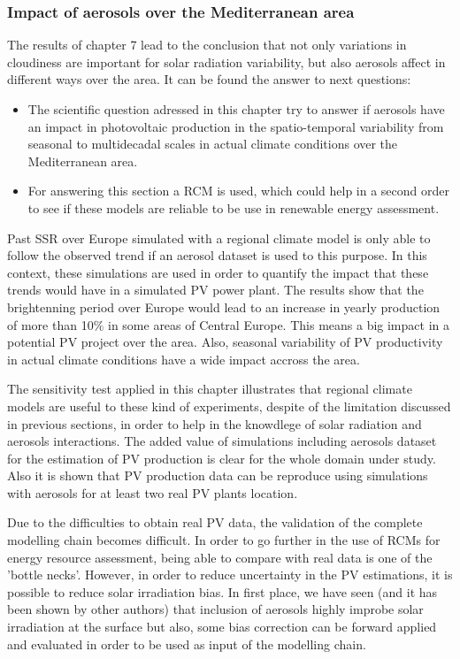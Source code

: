 \subsubsection{Impact of aerosols over the Mediterranean area}

The results of chapter 7 lead to the conclusion that not only variations in cloudiness are important for solar radiation variability, but also aerosols affect in different ways over the area. It can be found the answer to next questions:

\begin{itemize}
  
\item The scientific question adressed in this chapter try to answer if aerosols have an impact in photovoltaic production in the spatio-temporal variability from seasonal to multidecadal scales in actual climate conditions over the Mediterranean area.
\item For answering this section a RCM is used, which could help in a second order to see if these models are reliable to be use in renewable energy assessment. 
\end{itemize}

Past SSR over Europe simulated with a regional climate model is only able to follow the observed trend if an aerosol dataset is used to this purpose. In this context, these simulations are used in order to quantify the impact that these trends would have in a simulated PV power plant. The results show that the brightenning period over Europe would lead to an increase in yearly production of more than 10$\%$ in some areas of Central Europe. This means a big impact in a potential PV project over the area. Also, seasonal variability of PV productivity in actual climate conditions have a wide impact accross the area.

The sensitivity test applied in this chapter illustrates that regional climate models are useful to these kind of experiments, despite of the limitation discussed in previous sections, in order to help in the knowdlege of solar radiation and aerosols interactions. The added value of simulations including aerosols dataset for the estimation of PV production is clear for the whole domain under study. Also it is shown that PV production data can be reproduce using simulations with aerosols for at least two real PV plants location.

Due to the difficulties to obtain real PV data, the validation of the complete modelling chain becomes difficult. In order to go further in the use of RCMs for energy resource assessment, being able to compare with real data is one of the 'bottle necks'. However, in order to reduce uncertainty in the PV estimations, it is possible to reduce solar irradiation bias. In first place, we have seen (and it has been shown by other authors) that inclusion of aerosols highly improbe solar irradiation at the surface but also, some bias correction can be forward applied and evaluated in order to be used as input of the modelling chain.  


